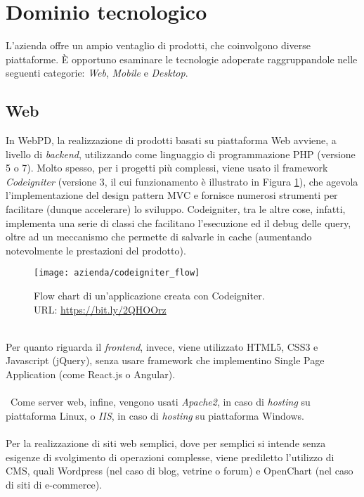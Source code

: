 \section{Dominio tecnologico}
L'azienda offre un ampio ventaglio di prodotti, che coinvolgono diverse piattaforme. È opportuno esaminare le tecnologie adoperate raggruppandole nelle seguenti categorie: \textit{Web}, \textit{Mobile} e \textit{Desktop}.

\subsection{Web}
In WebPD, la realizzazione di prodotti basati su piattaforma Web avviene, a livello di \textit{backend}, utilizzando come linguaggio di programmazione PHP (versione 5 o 7). Molto spesso, per i progetti più complessi, viene usato il framework \textit{Codeigniter} (versione 3, il cui funzionamento è illustrato in Figura \ref{figura:flow-chart-codeigniter}), che agevola l'implementazione del design pattern MVC e fornisce numerosi strumenti per facilitare (dunque accelerare) lo sviluppo. Codeigniter, tra le altre cose, infatti, implementa una serie di classi che facilitano l'esecuzione ed il debug delle query, oltre ad un meccanismo che permette di salvarle in cache (aumentando notevolmente le prestazioni del prodotto).\\
\begin{figure}[!h] 
	\centering 
	\texttt{[image: azienda/codeigniter\_flow]} 
	\caption{Flow chart di un'applicazione creata con Codeigniter.\\URL: \url{https://bit.ly/2QHOOrz}}
	\label{figura:flow-chart-codeigniter}
\end{figure}\\
Per quanto riguarda il \textit{frontend}, invece, viene utilizzato HTML5, CSS3 e Javascript (jQuery), senza usare framework che implementino Single Page Application (come React.js o Angular).\\\\\
Come server web, infine, vengono usati \textit{Apache2}, in caso di \textit{hosting} su piattaforma Linux, o  \textit{IIS}, in caso di \textit{hosting} su piattaforma Windows.\\\\
Per la realizzazione di siti web semplici, dove per semplici si intende senza esigenze di svolgimento di operazioni complesse, viene prediletto l'utilizzo di CMS, quali Wordpress (nel caso di blog, vetrine o forum) e OpenChart (nel caso di siti di e-commerce).
\\
\\
